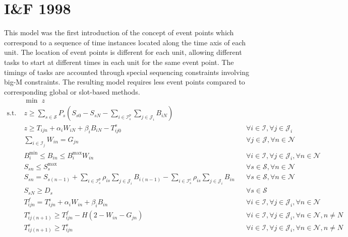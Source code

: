 \section{I\&F 1998}
This model \citep{Ierapetritou} was the first introduction of the concept of event points which correspond to a sequence of time instances located along the time axis of each unit. The location of event points is different for each unit, allowing different tasks to start at different times in each unit for the same event point. The timings of tasks are accounted through special sequencing constraints involving big-M constraints. The resulting model requires less event points compared to corresponding global or slot-based methods. 
\begin{align}
&\min \; z &&\\
\text{s.t.}\; &z \ge \sum_{s\in \mathcal{S}} P_s (S_{s0} - S_{sN}  -\sum_{i \in \mathcal{I}_{s}^p}\sum_{j \in \mathcal{J}_{i}} B_{iN}) && \\
		     & z \ge T_{ijn} + \alpha_i W_{iN} + \beta_{i} B_{iN} - T_{ij0}^s  && \forall i \in \mathcal{I}, \forall j \in \mathcal{J}_i \\
		     & \sum_{i \in \mathcal{I}_j} W_{in} = G_{jn} && \forall j \in \mathcal{J}, \forall n \in \mathcal{N} \\
		     &B_{i}^{\text{min}} \le B_{in} \le B_{i}^{\text{max}} W_{in} && \forall i \in \mathcal{I}, \forall j \in \mathcal{J}_i, \forall n \in \mathcal{N} \\
		     & S_{sn} \le S_{s}^{\text{max}} && \forall s \in \mathcal{S}, \forall n \in \mathcal{N} \\
		     & S_{sn} = S_{s(n-1)} + \sum_{i \in \mathcal{I}_{s}^p} \rho_{is} \sum_{j \in \mathcal{J}_{i}} B_{i(n-1)} - \sum_{i \in \mathcal{I}_{s}^c} \rho_{is} \sum_{j \in \mathcal{J}_{i}} B_{in}  &&\forall s \in \mathcal{S}, \forall n \in \mathcal{N} \\
		     & S_{sN} \ge D_s && \forall s \in \mathcal{S} \\
		     & T_{ijn}^f = T_{ijn}^s + \alpha_i W_{in} + \beta_i B_{in} && \forall i \in \mathcal{I}, \forall j \in \mathcal{J}_i, \forall n \in \mathcal{N} \\
		     & T_{ij(n+1)}^s \ge T_{ijn}^f - H (2 - W_{in} - G_{jn}) && \forall i \in \mathcal{I}, \forall j \in \mathcal{J}_i, \forall n \in \mathcal{N}, n \ne N \\
		     & T_{ij(n+1)}^s \ge T_{ijn}^s && \forall i \in \mathcal{I}, \forall j \in \mathcal{J}_i, \forall n \in \mathcal{N}, n \ne N \\

\end{align}
